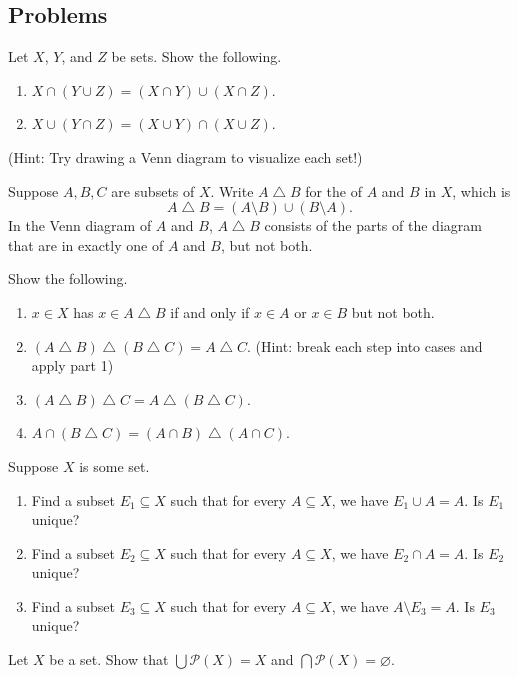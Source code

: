 \documentclass[../main.tex]{subfiles}
\begin{document}
\subsection{Problems}
\begin{homework}
    Let $X$, $Y$, and $Z$ be sets. Show the following.
    \begin{enumerate}[label=(\alph*)]
        \item $X \cap (Y \cup Z) = (X \cap Y) \cup (X \cap Z)$.
        \item $X \cup (Y \cap Z) = (X \cup Y) \cap (X \cup Z)$.
    \end{enumerate}
    (Hint: Try drawing a Venn diagram to visualize each set!)
\end{homework}
\begin{homework}
    Suppose $A, B, C$ are subsets of $X$. Write $A \operatorname{\triangle} B$ for the  of $A$ and $B$ in $X$, which is
    $$A \operatorname{\triangle} B = (A \setminus B) \cup (B \setminus A).$$
    In the Venn diagram of $A$ and $B$, $A \operatorname{\triangle} B$ consists of the parts of the diagram that are in exactly one of $A$ and $B$, but not both.
    
    Show the following.
    \begin{enumerate}[label=(\alph*)]
        \item $x \in X$ has $x \in A \operatorname{\triangle} B$ if and only if $x \in A$ or $x \in B$ but not both.
        \item $(A \operatorname{\triangle} B) \operatorname{\triangle} {(B \operatorname{\triangle} C)} = A \operatorname{\triangle} C$. (Hint: break each step into cases and apply part 1)
        \item $(A \operatorname{\triangle} B)\operatorname{\triangle}C=A\operatorname{\triangle}{}(B\operatorname{\triangle}C)$.
        \item $A\cap(B\operatorname{\triangle}C)=(A\cap B)\operatorname{\triangle}{}(A\cap C)$.
    \end{enumerate}
\end{homework}
\begin{homework}
    Suppose $X$ is some set.
    \begin{enumerate}[label=(\alph*)]
        \item Find a subset $E_1\subseteq X$ such that for every $A \subseteq X$, we have $E_1 \cup A = A$. Is $E_1$ unique?
        \item Find a subset $E_2\subseteq X$ such that for every $A \subseteq X$, we have $E_2 \cap A = A$. Is $E_2$ unique?
        \item Find a subset $E_3\subseteq X$ such that for every $A \subseteq X$, we have $A \setminus E_3 = A$. Is $E_3$ unique?
    \end{enumerate}
\end{homework}
\begin{homework}
    Let $X$ be a set. Show that $\bigcup \mathcal P(X) = X$ and $\bigcap \mathcal P(X) = \varnothing$.
\end{homework}
\end{document}

